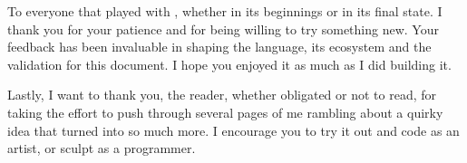 To everyone that played with \sculpt, whether in its beginnings or in its final state. I thank you for your patience and for being willing to try something new. Your feedback has been invaluable in shaping the language, its ecosystem and the validation for this document.
I hope you enjoyed it as much as I did building it.

Lastly, I want to thank you, the reader, whether obligated or not to read, for taking the effort to push through several pages of me rambling about
a quirky idea that turned into so much more. I encourage you to try it out and code as an artist, or sculpt as a programmer.
\endinput

